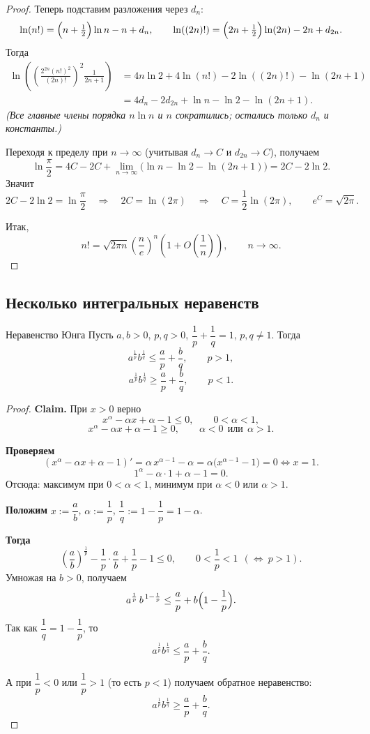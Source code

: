 \begin{proof}
	Теперь подставим разложения через $d_n$:
	\[
	\ln(n!)=\Bigl(n+\tfrac12\Bigr)\ln n-n+d_n,\qquad
	\ln((2n)!)=\Bigl(2n+\tfrac12\Bigr)\ln(2n)-2n+d_{2n}.
	\]
	Тогда
	\begin{align*}
		\ln\left(\left(\frac{2^{2n}(n!)^2}{(2n)!}\right)^2\frac{1}{2n+1}\right)
		&=4n\ln2+4\ln(n!)-2\ln((2n)!)-\ln(2n+1)\\
		&=4d_n-2d_{2n}+\ln n-\ln2-\ln(2n+1).
	\end{align*}
	\emph{(Все главные члены порядка $n\ln n$ и $n$ сократились; остались только $d_n$ и константы.)}
	
	Переходя к пределу при $n\to\infty$ (учитывая $d_n\to C$ и $d_{2n}\to C$), получаем
	\[
	\ln\frac{\pi}{2}=4C-2C+\lim_{n\to\infty}\bigl(\ln n-\ln2-\ln(2n+1)\bigr)
	=2C-2\ln2.
	\]
	Значит
	\[
	2C-2\ln2=\ln\frac{\pi}{2}
	\quad\Rightarrow\quad
	2C=\ln(2\pi)
	\quad\Rightarrow\quad
	C=\frac12\ln(2\pi),
	\qquad
	e^{C}=\sqrt{2\pi}.
	\]
	
	Итак,
	\[
	n!=\sqrt{2\pi n}\left(\frac{n}{e}\right)^n\left(1+O\!\left(\frac1n\right)\right),
	\qquad n\to\infty.
	\]
\end{proof}

\subsection{Несколько интегральных неравенств}

\begin{Statement}{Неравенство Юнга}{}
	Пусть $a,b>0$, $p,q>0$, $\dfrac{1}{p}+\dfrac{1}{q}=1$, $p,q\ne 1$. Тогда
	\[
	a^{\frac{1}{p}}b^{\frac{1}{q}}\le \frac{a}{p}+\frac{b}{q},\qquad p>1,
	\]
	\[
	a^{\frac{1}{p}}b^{\frac{1}{q}}\ge \frac{a}{p}+\frac{b}{q},\qquad p<1.
	\]
\end{Statement}	

\begin{proof} 
	
	\textbf{Claim.} При $x>0$ верно
	\[
	x^{\alpha}-\alpha x+ \alpha-1\le 0,\qquad 0<\alpha<1,
	\]
	\[
	x^{\alpha}-\alpha x+ \alpha-1\ge 0,\qquad \alpha<0\ \ \text{или}\ \ \alpha>1.
	\]
	
	\textbf{Проверяем}
	\[
	(x^{\alpha}- \alpha x+ \alpha-1)'= \alpha\,x^{\alpha-1}- \alpha = \alpha \bigl(x^{\alpha-1}-1\bigr)=0
	\iff x=1.
	\]
	\[
	1^{\alpha}-\alpha \cdot 1+\alpha-1=0.
	\]
	Отсюда: максимум при $0<\alpha<1$, минимум при $\alpha<0$ или $\alpha>1$.
	
	\medskip
	\textbf{Положим} $x:=\dfrac{a}{b}$, \quad $\alpha:=\dfrac{1}{p}$, \quad
	$\dfrac{1}{q}:=1-\dfrac{1}{p}=1-\alpha$.
	
	\textbf{Тогда}
	\[
	\left(\frac{a}{b}\right)^{\!\frac1p}-\frac{1}{p}\cdot\frac{a}{b}+\frac{1}{p}-1\le 0,
	\qquad 0<\frac{1}{p}<1 \ \ (\Leftrightarrow\ p>1).
	\]
	Умножая на $b>0$, получаем
	\[
	a^{\frac1p}\,b^{\,1-\frac1p}\le \frac{a}{p}+b\Bigl(1-\frac{1}{p}\Bigr).
	\]
	Так как $\dfrac{1}{q}=1-\dfrac{1}{p}$, то
	\[
	a^{\frac1p}b^{\frac1q}\le \frac{a}{p}+\frac{b}{q}.
	\]
	
	А при $\dfrac{1}{p}<0$ или $\dfrac{1}{p}>1$ (то есть $p<1$) получаем обратное неравенство:
	\[
	a^{\frac1p}b^{\frac1q}\ge \frac{a}{p}+\frac{b}{q}.
	\]
\end{proof}

